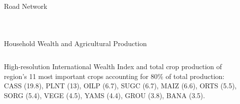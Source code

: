 \documentclass[aspectratio=169,xcolor=dvipsnames]{beamer}
\begin{document}
\begin{frame}{Road Network}
\begin{adjustbox}{center}
\begin{columns}
\begin{column}{0.9\textwidth}
{\begin{tabular}{@{}c@{}c@{}}
\end{tabular}
}
        \end{column}
    \end{columns}
  \end{adjustbox}
\end{frame}


\begin{frame}{Household Wealth and Agricultural Production} \vspace{-3mm}
\begin{adjustbox}{center}
    \begin{columns} \setlength{\columnsep}{1mm} %
        \begin{column}{0.23\textwidth}
  
\small High-resolution International Wealth Index \citep{lee2022high} and total crop production \citep{SPAM} of region's 11 most important crops accounting for 80\% of total production:\\\vspace{3mm}
\scriptsize
CASS (19.8), PLNT (13), OILP (6.7), SUGC (6.7), MAIZ (6.6), ORTS (5.5), SORG (5.4), VEGE (4.5), YAMS (4.4), GROU (3.8), BANA (3.5).
        \end{column}
        \begin{column}{0.85\textwidth}
\end{column}
\end{columns}
\end{adjustbox}
\end{frame}
\end{document}
